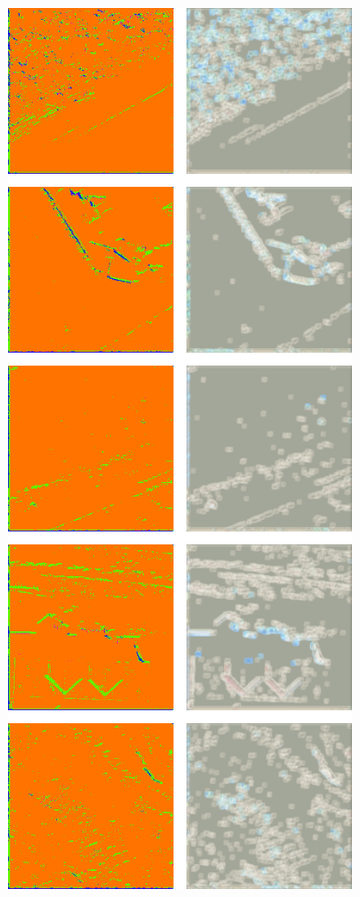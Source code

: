 \begin{figure}[h]
\begin{subfigure}{0.0866\textwidth}
        \caption{}
        \label{fig:wnet_pred_original}
    \end{subfigure} \hspace{3mm}
    \begin{subfigure}{\WnetPredictionsImageWidth}
        \includegraphics[width=\textwidth]{images/wnet/36d-6}

\end{subfigure}
\end{figure}
